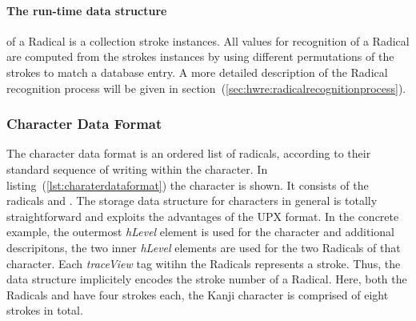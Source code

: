 \paragraph{The run-time data structure} of a Radical is a collection stroke instances.
All values for recognition of a Radical are computed from the strokes instances
by using different permutations of the strokes to match a database entry. A more
detailed description of the Radical recognition process will be given in
section~(\ref{sec:hwre:radicalrecognitionprocess}).

\subsubsection{Character Data Format}
\label{sec:hwre:characterdataformat}

The character data format is an ordered list of radicals, according to their
standard sequence of writing within the character. In 
listing~(\ref{lst:charaterdataformat}) the character  is shown.
It consists of the radicals  and . The storage data structure 
for characters in general is totally straightforward and exploits the 
advantages of the UPX format.
In the concrete example, the outermost \emph{hLevel} element is used for the 
character and additional descripitons, the two inner \emph{hLevel} elements are 
used for the two Radicals of that character. Each \emph{traceView} tag witihn 
the Radicals represents a stroke. Thus, the data structure implicitely encodes
the stroke number of a Radical. Here, both the Radicals  and 
have four strokes each, the Kanji character  is comprised of 
eight strokes in total.
